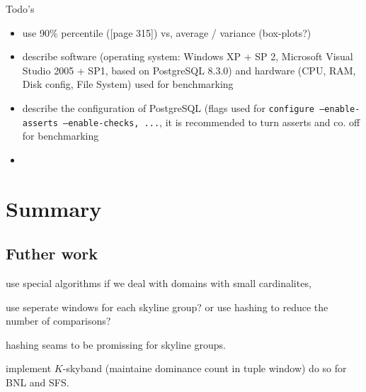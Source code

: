 Todo's

\begin{itemize}
\item use 90\% percentile (\citep{Gray1993}[page 315]) vs, average / variance (box-plots?)
\item describe software (operating system: Windows XP + SP 2, Microsoft Visual Studio 2005 + SP1, based on PostgreSQL 8.3.0) and hardware (CPU, RAM, Disk config, File System) used for benchmarking

\item describe the configuration of PostgreSQL (flags used for \texttt{configure --enable-asserts --enable-checks, ...}, it is recommended to turn asserts and co. off for benchmarking

\item {}
\end{itemize}



\chapter*{Summary\revision}
\section{Futher work}

use special algorithms if we deal with domains with small cardinalites, \citep{Preisinger2006, Preisinger2007, Morse2007}

use seperate windows for each skyline group? or use hashing to reduce the number of comparisons?

hashing seams to be promissing for skyline groups.

implement $K$-skyband (maintaine dominance count in tuple window) do so for BNL and SFS.







